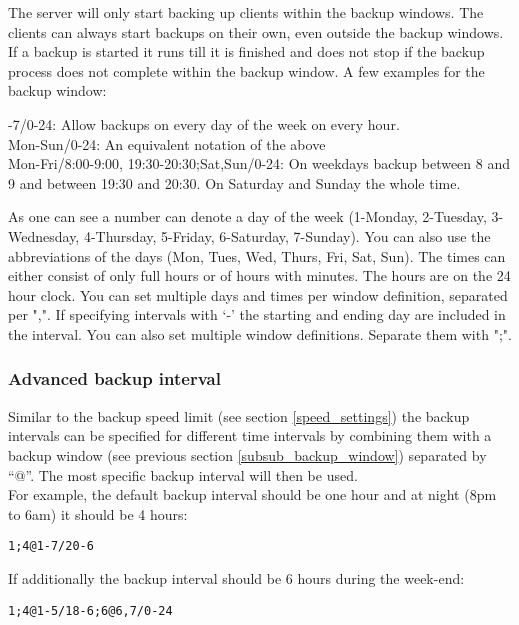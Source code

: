 \documentclass[a4paper,10pt]{article}
\begin{document}
The server will only start backing up clients within the backup windows. The clients can always start backups on their own, even outside the backup windows. If a backup is started it runs till it is finished and does not stop if the backup process does not complete within the backup window. A few examples for the backup window:
\par\null\par
{}-7/0-24: Allow backups on every day of the week on every hour.\\
Mon-Sun/0-24: An equivalent notation of the above\\
Mon-Fri/8:00-9:00, 19:30-20:30;Sat,Sun/0-24: On weekdays backup between 8 and 9 and between 19:30 and 20:30. On Saturday and Sunday the whole time.
\par\null\par
As one can see a number can denote a day of the week (1-Monday, 2-Tuesday, 3-Wednesday, 4-Thursday, 5-Friday, 6-Saturday, 7-Sunday). You can also use the abbreviations of the days (Mon, Tues, Wed, Thurs, Fri, Sat, Sun). The times can either consist of only full hours or of hours with minutes. The hours are on the 24 hour clock. You can set multiple days and times per window definition, separated per ",". If specifying intervals with `-' the starting and ending day are included in the interval. You can also set multiple window definitions. Separate them with ";".

\subsubsection{Advanced backup interval}
\label{advanced_backup_interval}

Similar to the backup speed limit (see section \ref{speed_settings}) the backup intervals can be specified for different time intervals by combining them with a backup window (see previous section \ref{subsub_backup_window}) separated by ``@''. The most specific backup interval will then be used.\\

\noindent For example, the default backup interval should be one hour and at night (8pm to 6am) it should be 4 hours:

\begin{verbatim}
1;4@1-7/20-6
\end{verbatim}

\noindent If additionally the backup interval should be 6 hours during the week-end:

\begin{verbatim}
1;4@1-5/18-6;6@6,7/0-24
\end{verbatim}
\end{document}
